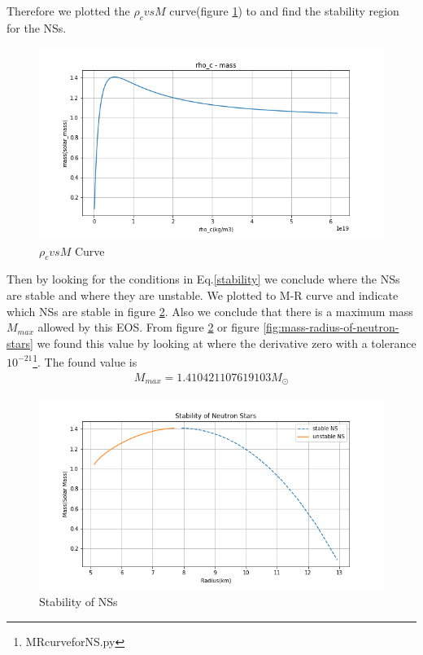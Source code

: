 \documentclass[aps,twocolumn,showpacs,preprintnumbers,nofootinbib,prl,superscriptaddress,groupedaddress]{revtex4-1}
\begin{document}
Therefore we plotted the $\rho_c vs M$ curve(figure \ref{fig:rhoc---mass-of-neutron-stars}) to and find the stability region for the NSs.
\begin{figure}
	\centering
	\includegraphics[width=1.0\linewidth]{"Figures/Figures_Einstein/rho_c - mass of Neutron Stars"}
	\caption{$\rho_c vs M$ Curve}
	\label{fig:rhoc---mass-of-neutron-stars}
\end{figure}
Then by looking for the conditions in Eq.\ref{stability} we conclude where the NSs are stable and where they are unstable. We plotted to M-R curve and indicate which NSs are stable in figure \ref{fig:stability-of-neutron-stars}. Also we conclude that there is a maximum mass $M_{max}$ allowed by this EOS. From figure \ref{fig:stability-of-neutron-stars} or figure \ref{fig:mass-radius-of-neutron-stars} we found this value by looking at where the derivative zero with a tolerance $10^{-21}$\footnote{{MRcurveforNS.py}}. The found value is
\begin{align}\label{maxM}
	M_{max} = 1.410421107619103  M_\odot
\end{align}

\begin{figure}
	\centering
	\includegraphics[width=1.0\linewidth]{"Figures/Figures_Einstein/stability of Neutron Stars"}
	\caption{Stability of NSs}
	\label{fig:stability-of-neutron-stars}
\end{figure}
\end{document}

